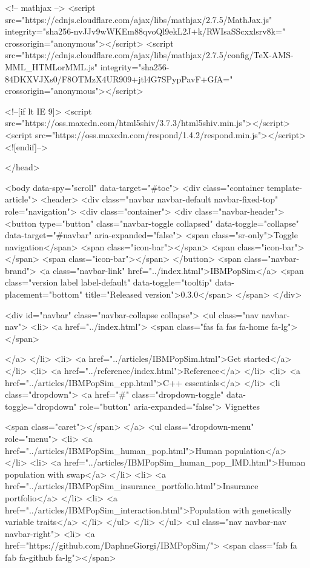 <!-- mathjax -->
<script src="https://cdnjs.cloudflare.com/ajax/libs/mathjax/2.7.5/MathJax.js" integrity="sha256-nvJJv9wWKEm88qvoQl9ekL2J+k/RWIsaSScxxlsrv8k=" crossorigin="anonymous"></script>
<script src="https://cdnjs.cloudflare.com/ajax/libs/mathjax/2.7.5/config/TeX-AMS-MML_HTMLorMML.js" integrity="sha256-84DKXVJXs0/F8OTMzX4UR909+jtl4G7SPypPavF+GfA=" crossorigin="anonymous"></script>

<!--[if lt IE 9]>
<script src="https://oss.maxcdn.com/html5shiv/3.7.3/html5shiv.min.js"></script>
<script src="https://oss.maxcdn.com/respond/1.4.2/respond.min.js"></script>
<![endif]-->



  </head>

  <body data-spy="scroll" data-target="#toc">
    <div class="container template-article">
      <header>
      <div class="navbar navbar-default navbar-fixed-top" role="navigation">
  <div class="container">
    <div class="navbar-header">
      <button type="button" class="navbar-toggle collapsed" data-toggle="collapse" data-target="#navbar" aria-expanded="false">
        <span class="sr-only">Toggle navigation</span>
        <span class="icon-bar"></span>
        <span class="icon-bar"></span>
        <span class="icon-bar"></span>
      </button>
      <span class="navbar-brand">
        <a class="navbar-link" href="../index.html">IBMPopSim</a>
        <span class="version label label-default" data-toggle="tooltip" data-placement="bottom" title="Released version">0.3.0</span>
      </span>
    </div>

    <div id="navbar" class="navbar-collapse collapse">
      <ul class="nav navbar-nav">
        <li>
  <a href="../index.html">
    <span class="fas fa fas fa-home fa-lg"></span>
     
  </a>
</li>
<li>
  <a href="../articles/IBMPopSim.html">Get started</a>
</li>
<li>
  <a href="../reference/index.html">Reference</a>
</li>
<li>
  <a href="../articles/IBMPopSim_cpp.html">C++ essentials</a>
</li>
<li class="dropdown">
  <a href="#" class="dropdown-toggle" data-toggle="dropdown" role="button" aria-expanded="false">
    Vignettes
     
    <span class="caret"></span>
  </a>
  <ul class="dropdown-menu" role="menu">
    <li>
      <a href="../articles/IBMPopSim_human_pop.html">Human population</a>
    </li>
    <li>
      <a href="../articles/IBMPopSim_human_pop_IMD.html">Human population with swap</a>
    </li>
    <li>
      <a href="../articles/IBMPopSim_insurance_portfolio.html">Insurance portfolio</a>
    </li>
    <li>
      <a href="../articles/IBMPopSim_interaction.html">Population with genetically variable traits</a>
    </li>
  </ul>
</li>
      </ul>
      <ul class="nav navbar-nav navbar-right">
        <li>
  <a href="https://github.com/DaphneGiorgi/IBMPopSim/">
    <span class="fab fa fab fa-github fa-lg"></span>
     
